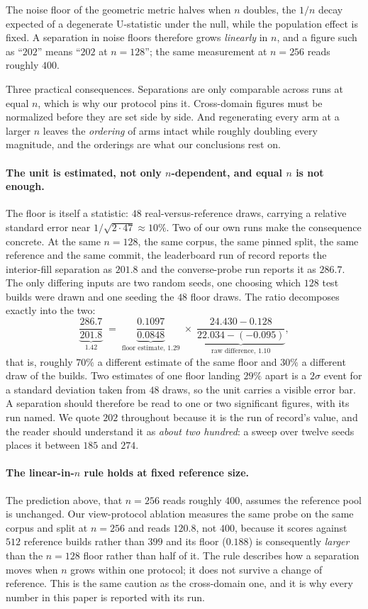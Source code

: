 The noise floor of the geometric metric halves when $n$ doubles, the $1/n$ decay
expected of a degenerate U-statistic under the null, while the
population effect is fixed. A separation in noise floors therefore grows
\emph{linearly} in $n$, and a figure such as ``$202$'' means ``$202$ at
$n{=}128$''; the same measurement at $n{=}256$ reads roughly $400$.

Three practical consequences. Separations are only comparable across runs at
equal $n$, which is why our protocol pins it. Cross-domain figures must be
normalized before they are set side by side. And regenerating every arm at a
larger $n$ leaves the \emph{ordering} of arms intact while roughly doubling
every magnitude, and the orderings are what our conclusions rest on.

\paragraph{The unit is estimated, not only $n$-dependent, and equal $n$ is not
enough.} The floor is itself a statistic: $48$ real-versus-reference draws,
carrying a relative standard error near $1/\sqrt{2 \cdot 47} \approx 10\%$.
Two of our own runs make the consequence concrete. At the same $n{=}128$, the
same corpus, the same pinned split, the same reference and the same commit, the
leaderboard run of record reports the interior-fill separation as
$\mathbf{201.8}$ and the converse-probe run reports it as $\mathbf{286.7}$.
The only differing inputs are two random seeds, one choosing which $128$ test
builds were drawn and one seeding the $48$ floor draws. The ratio decomposes
exactly into the two:
\[
\underbrace{\frac{286.7}{201.8}}_{1.42}
\;=\;
\underbrace{\frac{0.1097}{0.0848}}_{\text{floor estimate, } 1.29}
\;\times\;
\underbrace{\frac{24.430 - 0.128}{22.034 - (-0.095)}}_{\text{raw difference, } 1.10},
\]
that is, roughly $70\%$ a different estimate of the same floor and $30\%$ a
different draw of the builds. Two estimates of one floor landing $29\%$ apart is
a $2\sigma$ event for a standard deviation taken from $48$ draws, so the unit
carries a visible error bar. A separation should therefore be read to one or two
significant figures, with its run named. We quote $202$ throughout because it is
the run of record's value, and the reader should understand it as \emph{about two
hundred}: a sweep over twelve seeds places it between $185$ and $274$.

\paragraph{The linear-in-$n$ rule holds at fixed reference size.} The
prediction above, that $n{=}256$ reads roughly $400$, assumes the reference
pool is unchanged. Our view-protocol ablation measures the same probe on the
same corpus and split at $n{=}256$ and reads $120.8$, not $400$, because it
scores against $512$ reference builds rather than $399$ and its floor
($0.188$) is consequently \emph{larger} than the $n{=}128$ floor rather than
half of it. The rule describes how a separation moves when $n$ grows within one
protocol; it does not survive a change of reference. This is the same caution as
the cross-domain one, and it is why every number in this paper is reported with
its run.

